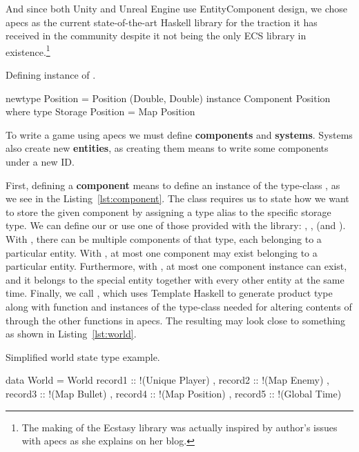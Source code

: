 \documentclass[
  digital, %
  color,   %
  table,   %
  oneside, %
  lof,     %
  lot,     %
]{fithesis3}
\begin{document}
And since both Unity and Unreal Engine use Entity\textendash{}Component design,
we chose apecs as the current state-of-the-art Haskell library
for the traction it has received in the community despite
it not being the only ECS library in existence.\footnote{
The making of the Ecstasy library was actually inspired by
author's issues with apecs as she explains on her blog.\cite{whyecstasy}
}

\begin{listing}[H]
\caption{Defining instance of .}
\begin{haskell}
newtype Position = Position (Double, Double)
instance Component Position where
    type Storage Position = Map Position
\end{haskell}
\label{lst:component}
\end{listing}

To write a game using apecs we must define \textbf{components} and \textbf{systems}.
Systems also create new \textbf{entities},
as creating them means to write some components under a new ID.

First, defining a \textbf{component} means to define an instance of the type-class
, as we see in the Listing~\ref{lst:component}.
The  class
requires us to state how we want to store the given component
by assigning a type alias to the specific storage type.
We can define our  or use one of those provided
with the library: , ,  (and ).
With , there can be multiple components of that type,
each belonging to a particular entity.
With , at most one component may exist
belonging to a particular entity. Furthermore,
with , at most one component instance can exist,
and it belongs to the special  entity together
with every other entity at the same time. Finally, we call ,
which uses Template Haskell to generate  product type
along with  function and instances of the 
type-class needed for altering contents of  through
the other functions in apecs. The resulting 
may look close to something as shown in Listing~\ref{lst:world}.

\begin{listing}[H]
\caption{Simplified world state type example.}
\begin{haskell}
data World =
    World
    { record1 :: !(Unique Player)
    , record2 :: !(Map Enemy)
    , record3 :: !(Map Bullet)
    , record4 :: !(Map Position)
    , record5 :: !(Global Time)
    }
\end{haskell}
\label{lst:world}
\end{listing}
\end{document}
